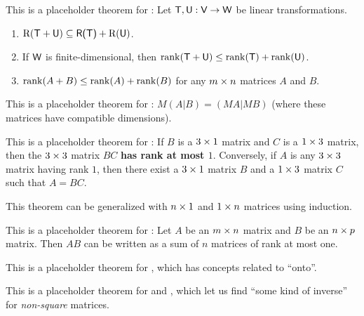 \begin{additional theorem} \label{athm 3.6}
This is a placeholder theorem for :
Let \(\textsf{T}, \textsf{U}: \textsf{V} \to \textsf{W}\) be linear transformations.
\begin{enumerate}
\item \(\mathrm{R}(\textsf{T} + \textsf{U}) \subseteq \textsf{R(T)} + \mathrm{R}(\textsf{U})\).
\item If \(\textsf{W}\) is finite-dimensional, then \(\mathrm{rank}(\textsf{T} + \textsf{U}) \le \mathrm{rank}(\textsf{T}) + \mathrm{rank}(\textsf{U})\).
\item \(\mathrm{rank}(A + B) \le \mathrm{rank}(A) + \mathrm{rank}(B)\) for any \(m \times n\) matrices \(A\) and \(B\).
\end{enumerate}
\end{additional theorem}

\begin{additional theorem} \label{athm 3.7}
\sloppy This is a placeholder theorem for :
\(M(A|B) = (MA|MB)\) (where these matrices have compatible dimensions).
\end{additional theorem}

\begin{additional theorem} \label{athm 3.8}
This is a placeholder theorem for :
If \(B\) is a \(3 \times 1\) matrix and \(C\) is a \(1 \times 3\) matrix, then the \(3 \times 3\) matrix \(BC\) \textbf{has rank at most \(1\)}.
Conversely, if \(A\) is any \(3 \times 3\) matrix having rank \(1\), then there exist a \(3 \times 1\) matrix \(B\) and a \(1 \times 3\) matrix \(C\) such that \(A = BC\).

This theorem can be generalized with \(n \times 1\) and \(1 \times n\) matrices using induction.
\end{additional theorem}

\begin{additional theorem} \label{athm 3.9}
This is a placeholder theorem for :
Let \(A\) be an \(m \times n\) matrix and \(B\) be an \(n \times p\) matrix.
Then \(AB\) can be written as a sum of \(n\) matrices of rank at most one.
\end{additional theorem}

\begin{additional theorem} \label{athm 3.10}
This is a placeholder theorem for , which has concepts related to ``onto''.
\end{additional theorem}

\begin{additional theorem} \label{athm 3.11}
This is a placeholder theorem for  and , which let us find ``some kind of inverse'' for \emph{non-square} matrices.
\end{additional theorem}